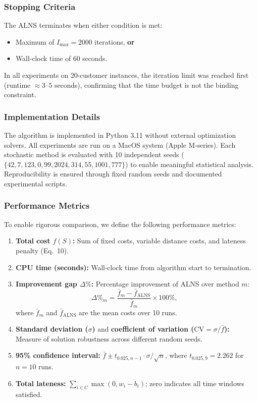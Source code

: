 \documentclass[11pt]{article}
\begin{document}
\subsubsection{Stopping Criteria}

The ALNS terminates when either condition is met:
\begin{itemize}[leftmargin=*]
    \item Maximum of $I_{\max} = 2000$ iterations, \textbf{or}
    \item Wall-clock time of 60 seconds.
\end{itemize}
In all experiments on 20-customer instances, the iteration limit was reached first (runtime $\approx 3$--$5$ seconds), confirming that the time budget is not the binding constraint.

\subsubsection{Implementation Details}

The algorithm is implemented in Python 3.11 without external optimization solvers. All experiments are run on a MacOS system (Apple M-series). Each stochastic method is evaluated with 10 independent seeds ($\{42, 7, 123, 0, 99, 2024, 314, 55, 1001, 777\}$) to enable meaningful statistical analysis. Reproducibility is ensured through fixed random seeds and documented experimental scripts.

\subsubsection{Performance Metrics}

To enable rigorous comparison, we define the following performance metrics:
\begin{enumerate}[leftmargin=*]
    \item \textbf{Total cost $f(S)$:} Sum of fixed costs, variable distance costs, and lateness penalty (Eq.~10).
    \item \textbf{CPU time (seconds):} Wall-clock time from algorithm start to termination.
    \item \textbf{Improvement gap $\Delta\%$:} Percentage improvement of ALNS over method $m$:
    \begin{equation}
    \Delta\%_m = \frac{\bar{f}_m - \bar{f}_{\text{ALNS}}}{\bar{f}_m} \times 100\%,
    \end{equation}
    where $\bar{f}_m$ and $\bar{f}_{\text{ALNS}}$ are the mean costs over 10 runs.
    \item \textbf{Standard deviation ($\sigma$)} and \textbf{coefficient of variation ($\text{CV} = \sigma / \bar{f}$):} Measure of solution robustness across different random seeds.
    \item \textbf{95\% confidence interval:} $\bar{f} \pm t_{0.025, n-1} \cdot \sigma / \sqrt{n}$, where $t_{0.025,9} = 2.262$ for $n = 10$ runs.
    \item \textbf{Total lateness:} $\sum_{i \in C} \max(0, w_i - b_i)$; zero indicates all time windows satisfied.
\end{enumerate}
\end{document}
